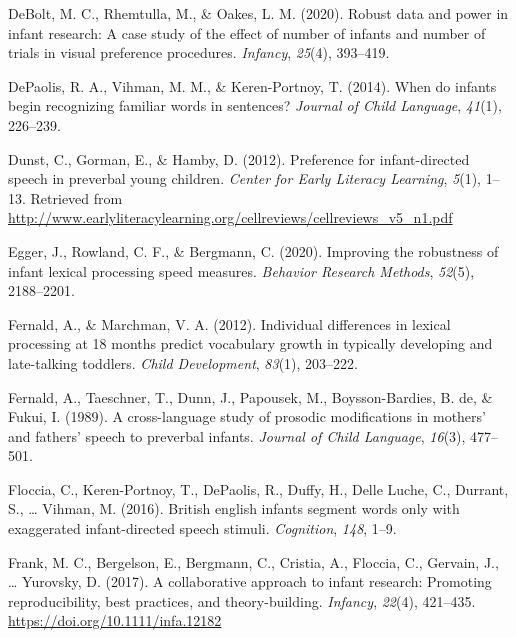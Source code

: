\documentclass[
  man,floatsintext]{apa6}
\newlength{\cslhangindent}
\newlength{\cslentryspacingunit} %
\newenvironment{CSLReferences}[2] %
 {%
  \setlength{\parindent}{0pt}
  \ifodd #1
  \let\oldpar\par
  \def\par{\hangindent=\cslhangindent\oldpar}
  \fi
  \setlength{\parskip}{#2\cslentryspacingunit}
 }%
 {}
\begin{document}
\begin{CSLReferences}{1}{0}
\leavevmode{}%
DeBolt, M. C., Rhemtulla, M., \& Oakes, L. M. (2020). Robust data and power in infant research: A case study of the effect of number of infants and number of trials in visual preference procedures. \emph{Infancy}, \emph{25}(4), 393--419.

\leavevmode{}%
DePaolis, R. A., Vihman, M. M., \& Keren-Portnoy, T. (2014). When do infants begin recognizing familiar words in sentences? \emph{Journal of Child Language}, \emph{41}(1), 226--239.

\leavevmode{}%
Dunst, C., Gorman, E., \& Hamby, D. (2012). Preference for infant-directed speech in preverbal young children. \emph{Center for Early Literacy Learning}, \emph{5}(1), 1--13. Retrieved from \url{http://www.earlyliteracylearning.org/cellreviews/cellreviews_v5_n1.pdf}

\leavevmode{}%
Egger, J., Rowland, C. F., \& Bergmann, C. (2020). Improving the robustness of infant lexical processing speed measures. \emph{Behavior Research Methods}, \emph{52}(5), 2188--2201.

\leavevmode{}%
Fernald, A., \& Marchman, V. A. (2012). Individual differences in lexical processing at 18 months predict vocabulary growth in typically developing and late-talking toddlers. \emph{Child Development}, \emph{83}(1), 203--222.

\leavevmode{}%
Fernald, A., Taeschner, T., Dunn, J., Papousek, M., Boysson-Bardies, B. de, \& Fukui, I. (1989). A cross-language study of prosodic modifications in mothers' and fathers' speech to preverbal infants. \emph{Journal of Child Language}, \emph{16}(3), 477--501.

\leavevmode{}%
Floccia, C., Keren-Portnoy, T., DePaolis, R., Duffy, H., Delle Luche, C., Durrant, S., \ldots{} Vihman, M. (2016). British english infants segment words only with exaggerated infant-directed speech stimuli. \emph{Cognition}, \emph{148}, 1--9.

\leavevmode{}%
Frank, M. C., Bergelson, E., Bergmann, C., Cristia, A., Floccia, C., Gervain, J., \ldots{} Yurovsky, D. (2017). A collaborative approach to infant research: Promoting reproducibility, best practices, and theory-building. \emph{Infancy}, \emph{22}(4), 421--435. \url{https://doi.org/10.1111/infa.12182}


\end{CSLReferences}
\end{document}
